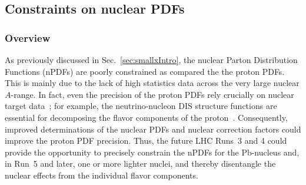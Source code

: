 \documentclass[../report.tex]{subfiles}
\begin{document}
\subsection{Constraints on nuclear PDFs}
\label{sec:nPDFs}
\subsubsection{Overview}
% 


As previously discussed in Sec.~\ref{sec:smallxIntro}, 
the nuclear Parton Distribution Functions (nPDFs) 
are poorly constrained as compared the the proton PDFs. 
This is mainly due to the lack of high statistics data 
across the very  large nuclear $A$-range. 
%
In fact, even the precision of the proton PDFs  rely crucially on 
nuclear target data~\cite{Ball:2017nwa,Dulat:2015mca,Alekhin:2017kpj};
for example,  the neutrino-nucleon DIS structure functions 
are essential for decomposing the flavor components of the 
proton~\cite{Onengut:2005kv,Goncharov:2001qe,Mason:2006qa,Samoylov:2013xoa,KayisTopaksu:2011mx}.
%
Consequently, improved determinations of the nuclear PDFs and nuclear correction factors 
could improve the proton PDF precision.
%
%
Thus, the future LHC Runs~3 and 4 could provide the opportunity to precisely constrain
the nPDFs for the Pb-nucleus and, in Run~5 and later, one or more lighter nuclei, and thereby
disentangle the nuclear effects from the individual flavor components.
\end{document}
